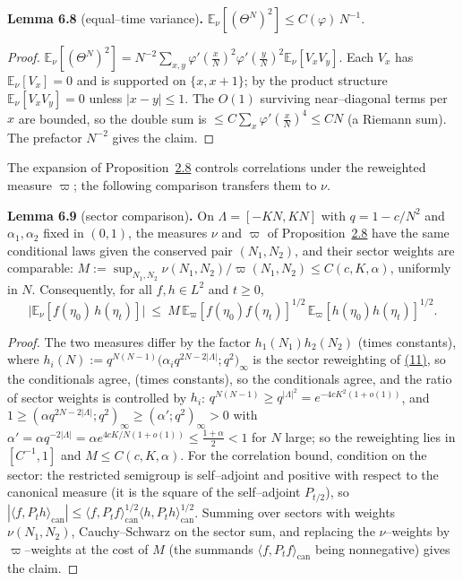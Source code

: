 \documentclass[11pt]{article}
\theoremstyle{plain}
\theoremstyle{definition}
\theoremstyle{remark}
\newcommand{\E}{\mathbb{E}}\newcommand{\PP}{\mathbb{P}}\newcommand{\dd}{\,\mathrm{d}}
\begin{document}
\label{lem_eqvar}\noindent\textbf{Lemma 6.8} (equal--time variance)\textbf{.} 
$\E_\nu[(\Theta^N)^2]\le C(\varphi)\,N^{-1}$.
\par
\begin{proof}
$\E_\nu[(\Theta^N)^2]=N^{-2}\sum_{x,y}\varphi'(\tfrac xN)^2\varphi'(\tfrac yN)^2\E_\nu[V_xV_y]$.
Each $V_x$ has $\E_\nu[V_x]=0$ and is supported on $\{x,x+1\}$; by the product structure
$\E_\nu[V_xV_y]=0$ unless $|x-y|\le1$. The $O(1)$ surviving near--diagonal terms per $x$
are bounded, so the double sum is $\le C\sum_x\varphi'(\tfrac xN)^4\le CN$ (a Riemann
sum). The prefactor $N^{-2}$ gives the claim.
\end{proof}

The expansion of Proposition~\hyperref[prop_orth]{2.8} controls correlations under the
reweighted measure $\varpi$; the following comparison transfers them to $\nu$.

\label{lem_sector}\noindent\textbf{Lemma 6.9} (sector comparison)\textbf{.} 
On $\Lambda=[-KN,KN]$ with $q=1-c/N^2$ and $\alpha_1,\alpha_2$ fixed in $(0,1)$, the
measures $\nu$ and $\varpi$ of Proposition~\hyperref[prop_orth]{2.8} have the same conditional
laws given the conserved pair $(N_1,N_2)$, and their sector weights are comparable:
$M:=\sup_{N_1,N_2}\nu(N_1,N_2)/\varpi(N_1,N_2)\le C(c,K,\alpha)$, uniformly in $N$.
Consequently, for all $f,h\in L^2$ and $t\ge0$,
\[
  \big|\E_\nu[f(\eta_0)\,h(\eta_t)]\big|\ \le\ M\,
  \E_\varpi[f(\eta_0)f(\eta_t)]^{1/2}\,\E_\varpi[h(\eta_0)h(\eta_t)]^{1/2}.
\]
\par
\begin{proof}
The two measures differ by the factor $h_1(N_1)h_2(N_2)$ (times constants), where
$h_i(N):=q^{N(N-1)}\big(\alpha_i q^{2N-2|\Lambda|};q^2\big)_\infty$ is the sector
reweighting of \hyperref[eq_omegadef]{(11)}, so the conditionals agree,
(times constants), so the conditionals agree, and the ratio of sector weights is
controlled by $h_i$: $q^{N(N-1)}\ge q^{|\Lambda|^2}=e^{-4cK^2(1+o(1))}$, and
$1\ge(\alpha q^{2N-2|\Lambda|};q^2)_\infty\ge(\alpha';q^2)_\infty>0$ with
$\alpha'=\alpha q^{-2|\Lambda|}=\alpha e^{4cK/N(1+o(1))}\le\tfrac{1+\alpha}2<1$ for
$N$ large; so the reweighting lies in $[C^{-1},1]$ and $M\le C(c,K,\alpha)$. For the
correlation bound, condition on the sector: the restricted semigroup is
self--adjoint and positive with respect to the canonical measure (it is the square
of the self--adjoint $P_{t/2}$), so
$|\langle f,P_th\rangle_{\mathrm{can}}|\le
\langle f,P_tf\rangle_{\mathrm{can}}^{1/2}\langle h,P_th\rangle_{\mathrm{can}}^{1/2}$.
Summing over sectors with weights $\nu(N_1,N_2)$, Cauchy--Schwarz on the sector sum,
and replacing the $\nu$--weights by $\varpi$--weights at the cost of $M$ (the
summands $\langle f,P_tf\rangle_{\mathrm{can}}$ being nonnegative) gives the claim.
\end{proof}
\end{document}
